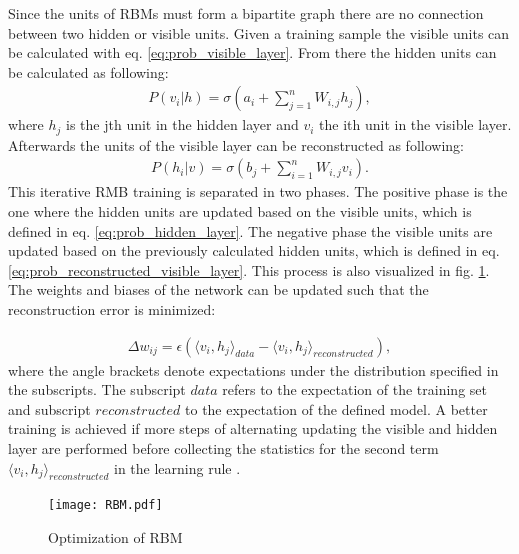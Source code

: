 Since the units of RBMs must form a bipartite graph there are no connection between two hidden or visible units. Given a training sample the visible units can be calculated with eq. \ref{eq:prob_visible_layer}. From there the hidden units can be calculated as following:
\begin{equation}
\begin{aligned}
    P(v_{i}|h) = \sigma(a_{i} + \sum_{j=1}^{n} W_{i,j} h_{j}),
    \label{eq:prob_hidden_layer}
\end{aligned}
\end{equation}
where $h_{j}$ is the jth unit in the hidden layer and $v_{i}$ the ith unit in the visible layer. Afterwards the units of the visible layer can be reconstructed as following:
\begin{equation}
\begin{aligned}
    P(h_{i}|v) = \sigma(b_{j} + \sum_{i=1}^{n} W_{i,j} v_{i}).
    \label{eq:prob_reconstructed_visible_layer}
\end{aligned}
\end{equation}
This iterative RMB training is separated in two phases. The positive phase is the one where the hidden units are updated based on the visible units, which is defined in eq. \ref{eq:prob_hidden_layer}. The negative phase the visible units are updated based on the previously calculated hidden units, which is defined in eq. \ref{eq:prob_reconstructed_visible_layer}. This process is also visualized in fig. \ref{fig:RBM}. The weights and biases of the network can be updated such that the reconstruction error is minimized:

\begin{equation}
\begin{aligned}
    \Delta w_{ij} = \epsilon(\langle v_{i}, h_{j}\rangle_{data}- \langle v_{i}, h_{j}\rangle_{reconstructed}), 
    \label{eq:RBM_weight_update}
\end{aligned}
\end{equation}
where the angle brackets denote expectations under the distribution specified in the subscripts. The subscript $data$ refers to the expectation of the training set and subscript $reconstructed$ to the expectation of the defined model. A better training is achieved if more steps of alternating updating the visible and hidden layer are performed before collecting the statistics for the second term $\langle v_{i}, h_{j}\rangle_{reconstructed}$ in the learning rule \cite{Hinton2010}.

\begin{figure}[htpb]
  \centering
  \texttt{[image: RBM.pdf]}
  \caption {Optimization of RBM} \label{fig:RBM}
\end{figure}
\FloatBarrier 

